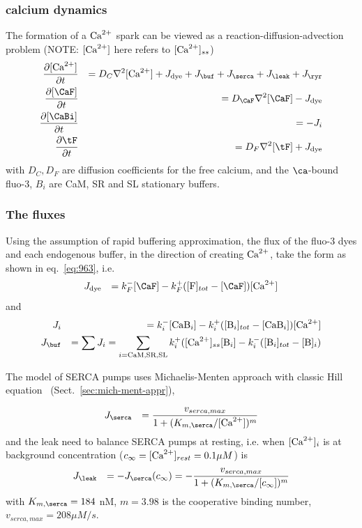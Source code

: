 \subsubsection{calcium dynamics}
\label{sec:calcium-dynamics}

The formation of a ${\text{Ca}^{2+}}$ spark can be viewed as a
reaction-diffusion-advection problem (NOTE: $[{\text{Ca}^{2+}}]$ here refers to
$[{\text{Ca}^{2+}}]_{ss}$)
\begin{eqnarray}
  \label{eq:957}
  \frac{\partial [\Ca]}{\partial t} &&= D_C\nabla^2[\Ca] + J_\text{dye}
  + J_\buf + J_\serca + J_\leak + J_\ryr \\
  \label{eq:957_b}
  \frac{\partial [\CaF]}{\partial t} &&= D_\CaF\nabla^2 [\CaF] -
  J_\text{dye} \\
  \label{eq:957_c}
  \frac{\partial [\CaBi]}{\partial t} &&= -J_i\\
  \label{eq:957_d}
  \frac{\partial \tF}{\partial t} &&=  D_F\nabla^2[\tF] + J_\text{dye}
\end{eqnarray}
with $D_C, D_F$ are diffusion coefficients for the free calcium, and
the $\ca$-bound fluo-3, $B_i$ are CaM, SR and SL stationary buffers.

\subsubsection{The fluxes}
\label{sec:fluxes-1}


Using the assumption of rapid buffering approximation, the flux of the
fluo-3 dyes and each endogenous buffer, in the direction of creating
${\text{Ca}^{2+}}$, take the form as shown in eq.~\eqref{eq:963}, i.e.
\begin{eqnarray}
  \label{eq:964}
  J_\dye &&= k^-_{F}  [\CaF] - k^+_{F} ([\ce{F}]_{tot}-[\CaF]) [\Ca] 
\end{eqnarray}
and
\begin{eqnarray}
  \label{eq:1032}
  J_i &&=  k^-_{i}  [\ce{CaB_i}] - k^+_{i} ([\ce{B_i}]_{tot}-[\ce{CaB_i}]) [\Ca] \\
  J_\buf &&= \sum J_i =  \sum_{i=\text{CaM,SR,SL}} k^+_{i}
  ([\Ca]_{ss}[\ce{B_i}] - k^-_{i}([\ce{B_i}]_{tot} - [\ce{B}]_i)
\end{eqnarray}

The model of SERCA pumps uses Michaelis-Menten approach with classic
Hill equation~\citep{bassani1994rir} (Sect.~\ref{sec:mich-ment-appr}),

\begin{eqnarray}
  \label{eq:952}
  J_\serca &&= \frac{v_{serca,max}}{1+(K_{m,\serca}/[\Ca])^m}\\
\end{eqnarray}
and the leak need to balance SERCA pumps at resting, i.e. when
$[{\text{Ca}^{2+}}]_i$ is at background concentration ($c_\infty =[{\text{Ca}^{2+}}]_{rest}=
0.1\mu M$) is
\begin{eqnarray}
  \label{eq:1117}
  J_\leak &&= -J_\serca(c_\infty) =
  -\frac{v_{serca,max}}{1+(K_{m,\serca}/[c_\infty])^m}
\end{eqnarray}
with $K_{m,\serca}=184$ nM, $m=3.98$ is the cooperative binding number,
$v_{serca,max}= 208 \mu M/s$.


